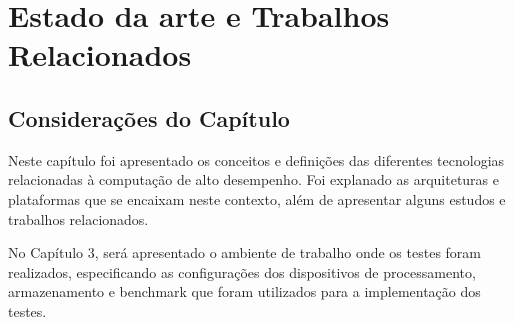 \chapter{Estado da arte e Trabalhos Relacionados  \label{cap:estado da arte e Trabalhos Relacionados}}






\section{Considerações do Capítulo}
Neste capítulo foi apresentado os conceitos e definições das diferentes tecnologias relacionadas à computação de alto desempenho. Foi explanado as arquiteturas e plataformas que se encaixam neste contexto, além de apresentar alguns estudos e trabalhos relacionados.

No Capítulo 3, será apresentado o ambiente de trabalho onde os testes foram realizados, especificando as configurações dos dispositivos de processamento, armazenamento e benchmark que foram utilizados para a implementação dos testes.
